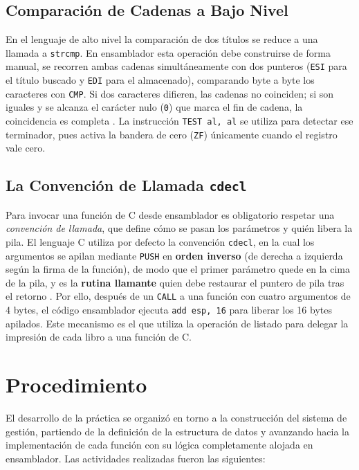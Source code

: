 \documentclass[a4paper,12pt]{article}
\begin{document}
\subsection{Comparación de Cadenas a Bajo Nivel}
En el lenguaje de alto nivel la comparación de dos títulos se reduce a una llamada a \texttt{strcmp}. En ensamblador esta operación debe construirse de forma manual, se recorren ambas cadenas simultáneamente con dos punteros (\texttt{ESI} para el título buscado y \texttt{EDI} para el almacenado), comparando byte a byte los caracteres con \texttt{CMP}. Si dos caracteres difieren, las cadenas no coinciden; si son iguales y se alcanza el carácter nulo (\texttt{0}) que marca el fin de cadena, la coincidencia es completa \cite{irvine2020assembly}. La instrucción \texttt{TEST al, al} se utiliza para detectar ese terminador, pues activa la bandera de cero (\texttt{ZF}) únicamente cuando el registro vale cero.

\subsection{La Convención de Llamada \texttt{cdecl}}
Para invocar una función de C desde ensamblador es obligatorio respetar una \textit{convención de llamada}, que define cómo se pasan los parámetros y quién libera la pila. El lenguaje C utiliza por defecto la convención \texttt{cdecl}, en la cual los argumentos se apilan mediante \texttt{PUSH} en \textbf{orden inverso} (de derecha a izquierda según la firma de la función), de modo que el primer parámetro quede en la cima de la pila, y es la \textbf{rutina llamante} quien debe restaurar el puntero de pila tras el retorno \cite{stallings2019computer}. Por ello, después de un \texttt{CALL} a una función con cuatro argumentos de 4 bytes, el código ensamblador ejecuta \texttt{add esp, 16} para liberar los 16 bytes apilados. Este mecanismo es el que utiliza la operación de listado para delegar la impresión de cada libro a una función de C.

\section{Procedimiento}
El desarrollo de la práctica se organizó en torno a la construcción del sistema de gestión, partiendo de la definición de la estructura de datos y avanzando hacia la implementación de cada función con su lógica completamente alojada en ensamblador. Las actividades realizadas fueron las siguientes:
\end{document}
